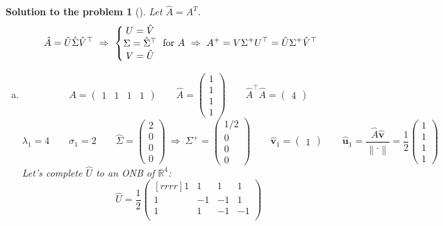 \documentclass[12pt,a4]{article}
\newtheorem{solution}{Solution to the problem}
\newcommand{\bR}{{\mathbb R}}
\newcommand{\bu}{{\mathbf u}}
\newcommand{\bv}{{\mathbf v}}
\newcommand{\norm}[1]{\left\lVert#1\right\rVert}
\begin{document}
\begin{solution}[] \rm
Let $\hat A = A^T$.
\[
\hat A = \hat U \hat\Sigma \hat V^\top
~\Rightarrow~
\left \{ \begin{matrix}
U = \hat V \\
\Sigma = \hat\Sigma^\top \\
V = \hat U \\
\end{matrix}\right. \text{ for } A
~\Rightarrow~
A^+ = V \Sigma^+ U^\top = \hat U \Sigma^+ \hat V^\top\\
\]
\begin{enumerate}[(a)]
	\item
\[
A =
\begin{pmatrix}
1 & 1 & 1 & 1
\end{pmatrix}
\qquad
\hat A =
\begin{pmatrix}
1 \\ 1 \\ 1 \\ 1
\end{pmatrix}
\qquad
\hat A^\top\hat A = 
\begin{pmatrix} 4 \end{pmatrix}
\]
\[
\lambda_1 = 4 \qquad \sigma_1 = 2
\qquad
\hat \Sigma = \begin{pmatrix} 2 \\ 0 \\ 0 \\ 0 \end{pmatrix}
~\Rightarrow~
\Sigma^+ = \begin{pmatrix} 1/2 \\ 0 \\ 0 \\ 0 \end{pmatrix}
\qquad
\hat \bv_1 = \begin{pmatrix} 1 \end{pmatrix}
\qquad
\hat \bu_1 = \frac{\hat A \hat \bv}{\norm{\cdot}} = \frac12 \begin{pmatrix} 1 \\ 1 \\ 1 \\ 1 \end{pmatrix}
\]
Let's complete $\hat U$ to an ONB of $\bR^4$:
\[
\hat U = \frac12
\begin{pmatrix}[rrrr]
1 & 1 & 1 & 1\\
1 & -1 & -1 & 1\\
1 & 1 & -1 & -1\\

\end{pmatrix}\]
\end{enumerate}
\end{solution}
\end{document}

